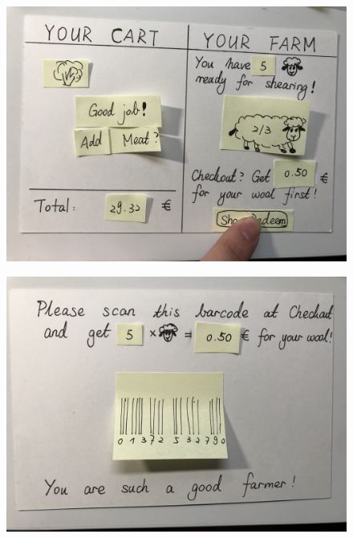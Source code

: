 \documentclass[a4paper,10pt,oneside]{scrreprt}
\begin{document}
\begin{figure}[h]
	\centering
	\includegraphics[scale=0.10, clip, trim={0em 0em 0em 0em}]{images/IMG_0581.jpg}
\end{figure}

\begin{figure}[h]
	\centering
	\includegraphics[scale=0.10, clip, trim={0em 0em 0em 0em}]{images/IMG_0582.jpg}
\end{figure}
\end{document}
